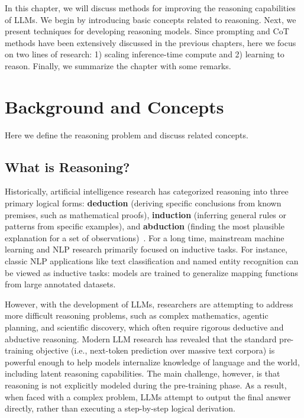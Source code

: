 In this chapter, we will discuss methods for improving the reasoning capabilities of LLMs. We begin by introducing basic concepts related to reasoning. Next, we present techniques for developing reasoning models. Since prompting and CoT methods have been extensively discussed in the previous chapters, here we focus on two lines of research: 1) scaling inference-time compute and 2) learning to reason. Finally, we summarize the chapter with some remarks.


\section{Background and Concepts}

Here we define the reasoning problem and discuss related concepts.

\subsection{What is Reasoning?}

Historically, artificial intelligence research has categorized reasoning into three primary logical forms: \textbf{deduction} (deriving specific conclusions from known premises, such as mathematical proofs), \textbf{induction} (inferring general rules or patterns from specific examples), and \textbf{abduction} (finding the most plausible explanation for a set of observations)~\cite{peirce1931:collected}. For a long time, mainstream machine learning and NLP research primarily focused on inductive tasks. For instance, classic NLP applications like text classification and named entity recognition can be viewed as inductive tasks: models are trained to generalize mapping functions from large annotated datasets.

However, with the development of LLMs, researchers are attempting to address more difficult reasoning problems, such as complex mathematics, agentic planning, and scientific discovery, which often require rigorous deductive and abductive reasoning. Modern LLM research has revealed that the standard pre-training objective (i.e., next-token prediction over massive text corpora) is powerful enough to help models internalize knowledge of language and the world, including latent reasoning capabilities. The main challenge, however, is that reasoning is not explicitly modeled during the pre-training phase. As a result, when faced with a complex problem, LLMs attempt to output the final answer directly, rather than executing a step-by-step logical derivation.

